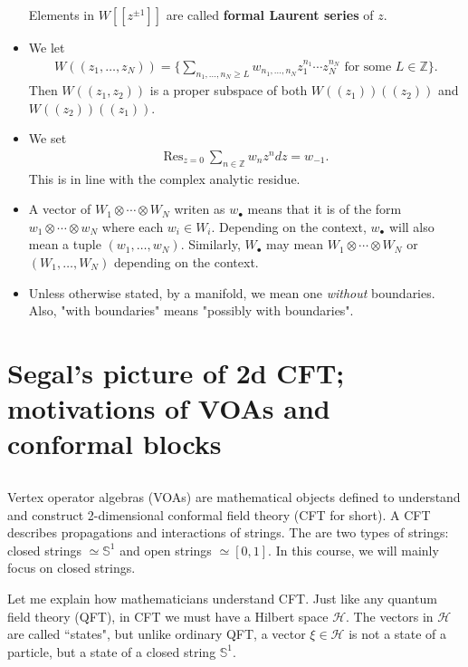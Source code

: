 \documentclass[11pt,b5paper,notitlepage]{article}
\theoremstyle{definition}
\theoremstyle{plain}
\newcommand{\mc}{\mathcal}
\newcommand{\Res}{\mathrm{Res}}
\newcommand{\blt}{\bullet}
\newcommand{\Zbb}{\mathbb Z}
\newcommand{\Sbb}{{\mathbb S}}
\numberwithin{equation}{section}
\begin{document}
\begin{itemize}
Elements in $W[[z^{\pm1}]]$ are called \textbf{formal Laurent series} of $z$.

\item We let
\begin{align*}
W((z_1,\dots,z_N))=\Big\{\sum_{n_1,\dots,n_N\geq L}w_{n_1,\dots,n_N}z_1^{n_1}\cdots z_N^{n_N}\text{ for some }L\in\Zbb\Big\}.
\end{align*}
Then $W((z_1,z_2))$ is a proper subspace of both $W((z_1))((z_2))$ and $W((z_2))((z_1))$.
\item We set
\begin{align}\label{eq18}
	\Res_{z=0}~\sum_{n\in\Zbb}w_nz^ndz=w_{-1}.
\end{align}
This is in line with the complex analytic residue.

\item A vector of $W_1\otimes\cdots\otimes W_N$ writen as $w_\blt$ means that it is of the form $w_1\otimes\cdots\otimes w_N$ where each $w_i\in W_i$. Depending on the context, $w_\blt$ will also mean a tuple $(w_1,\dots,w_N)$. Similarly, $W_\blt$ may mean $W_1\otimes\cdots\otimes W_N$ or $(W_1,\dots,W_N)$ depending on the context.

\item Unless otherwise stated, by a manifold, we mean one \emph{without} boundaries. Also, "with boundaries" means "possibly with boundaries".
\end{itemize}

\newpage


\section{Segal's picture of 2d CFT; motivations of VOAs and conformal blocks}

\subsection{}

Vertex operator algebras (VOAs) are mathematical objects defined to understand and construct 2-dimensional conformal field theory (CFT for short). A CFT describes propagations and interactions of strings. The are two types of strings: closed strings $\simeq\Sbb^1$ and open strings $\simeq[0,1]$. In this course, we will mainly focus on closed strings.

Let me explain how mathematicians understand CFT. Just like any quantum field theory (QFT), in CFT we must have a Hilbert space $\mc H$. The vectors in $\mc H$ are called ``states", but unlike ordinary QFT, a vector $\xi\in\mc H$ is not a state of a particle, but a state of a closed string $\Sbb^1$.
\end{document}
